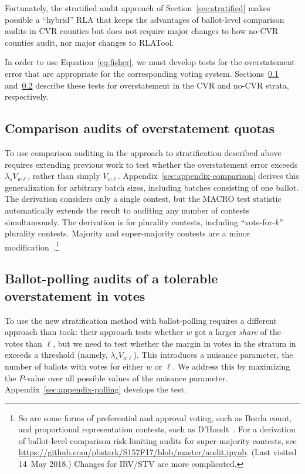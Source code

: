 \documentclass[runningheads]{llncs}
\begin{document}
Fortunately, the stratified audit approach of Section~\ref{sec:stratified} makes possible a ``hybrid'' RLA that keeps the advantages of ballot-level comparison audits in CVR counties but does not require major changes to how no-CVR counties audit, nor major changes to RLATool. 

In order to use Equation~\ref{eq:fisher}, we must develop tests for the overstatement error that are appropriate for the
corresponding voting system.
Sections~\ref{sec:comparisonError} and~\ref{sec:ballotPollError} describe these tests for overstatement in the CVR and no-CVR strata, respectively.

\subsection{Comparison audits of overstatement quotas}
\label{sec:comparisonError}

To use comparison auditing in the approach to stratification described above requires extending previous work to test whether the overstatement error exceeds $\lambda_s V_{w\ell}$, rather than simply $V_{w\ell}$.
Appendix~\ref{sec:appendix-comparison} derives this generalization for arbitrary batch sizes, including batches consisting of one ballot.
The derivation considers only a single contest, but the 
MACRO test statistic \cite{stark09c,stark10d} automatically extends the result to 
auditing any number of contests simultaneously.
The derivation is for plurality contests, including ``vote-for-$k$'' plurality contests.
Majority and super-majority contests are a minor 
modification~\cite{stark08a}.\footnote{%
  So are some forms of preferential and approval voting, such as Borda count, and
  proportional representation contests, such as D'Hondt~\cite{starkTeague14}.
  For a derivation of ballot-level comparison risk-limiting audits for super-majority contests, 
  see \url{https://github.com/pbstark/S157F17/blob/master/audit.ipynb}. (Last visited 14~May 2018.)
  Changes for IRV/STV are more complicated.
}

\subsection{Ballot-polling audits of a tolerable overstatement in votes}
\label{sec:ballotPollError}

To use the new stratification method with ballot-polling requires a different approach than \cite{lindemanEtal12} took: their approach tests whether $w$ got a larger \emph{share} of the votes than $\ell$, but we need to test whether the margin in votes in the stratum in exceeds a threshold (namely, $\lambda_s V_{w\ell}$).
This introduces a nuisance parameter, the number of ballots with votes for either $w$ or $\ell$.
We address this by maximizing the $P$-value over all possible values of the nuisance parameter.
Appendix~\ref{sec:appendix-polling} develops the test.
\end{document}
